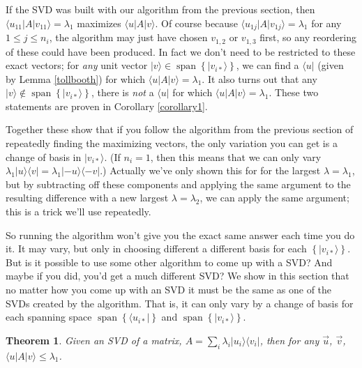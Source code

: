 \documentclass{amsbook}
\newtheorem{theorem}{Theorem}
\begin{document}
If the SVD was built with our algorithm from the previous section, then $\langle u_{11}|A|v_{11}\rangle=\lambda_1$ maximizes $\langle u|A|v\rangle$.  Of course because $\langle u_{1j}|A|v_{1j}\rangle=\lambda_1$ for any $1\leq j\leq n_i$, the algorithm may just have chosen $v_{1,2}$ or $v_{1,3}$ first, so any reordering of these could have been produced.  In fact we don't need to be restricted to these exact vectors; for {\em any} unit vector $|v\rangle\in\operatorname{span}\left\{|v_{i*}\rangle\right\}$, we can find a $\langle u|$ (given by Lemma \ref{tollbooth}) for which $\langle u|A|v\rangle=\lambda_1$.  It also turns out that any $|v\rangle\not\in\operatorname{span}\left\{|v_{i*}\rangle\right\}$, there is {\em not} a $\langle u|$ for which $\langle u|A|v\rangle=\lambda_1$.  These two statements are proven in Corollary \ref{corollary1}.

Together these show that if you follow the algorithm from the previous section of repeatedly finding the maximizing vectors, the only variation you can get is a change of basis in $|v_{i*}\rangle$.  (If $n_i=1$, then this means that we can only vary $\lambda_1|u\rangle\langle v|=\lambda_1|-u\rangle\langle -v|$.)  Actually we've only shown this for for the largest $\lambda=\lambda_1$, but by subtracting off these components and applying the same argument to the resulting difference with a new largest $\lambda=\lambda_2$, we can apply the same argument; this is a trick we'll use repeatedly.

So running the algorithm won't give you the exact same answer each time you do it.  It may vary, but only in choosing different a different basis for each $\left\{|v_{i*}\rangle\right\}$.  But is it possible to use some other algorithm to come up with a SVD?  And maybe if you did, you'd get a much different SVD?  We show in this section that no matter how you come up with an SVD it must be the same as one of the SVDs created by the algorithm.  That is, it can only vary by a change of basis for each spanning space $\operatorname{span}\left\{\langle u_{i*}|\right\}$ and $\operatorname{span}\left\{|v_{i*}\rangle\right\}$.

 \begin{theorem}
\label{upperbound}
Given an SVD of a matrix, $A=\sum_i\lambda_i|u_i\rangle\langle v_i|$, then for any $\vec u$, $\vec v$, $\langle u|A|v\rangle\leq\lambda_1$.
 \end{theorem}
\end{document}
